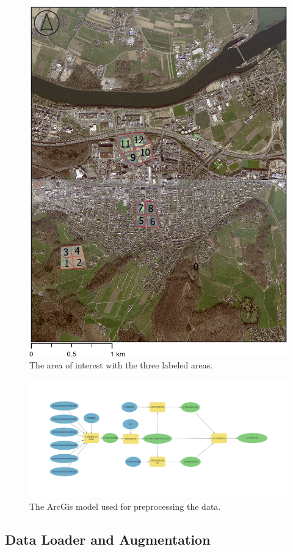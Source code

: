 \begin{figure}[H]
    \centering
    \captionsetup{width=0.8\linewidth}
    \includegraphics[scale=0.6]{figures/AOI_Labeled.png}
    \caption{The area of interest with the three labeled areas.}
    \label{fig:aoi_labeled}
\end{figure}

\begin{figure}
    \centering
    \captionsetup{width=0.8\linewidth}
    \includegraphics[width=\linewidth]{figures/Model.pdf}
    \caption{The ArcGis model used for preprocessing the data.}
    \label{fig:processing_model}
\end{figure}

\subsection{Data Loader and Augmentation}%

